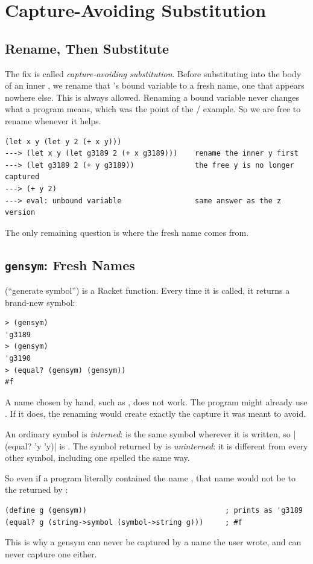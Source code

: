 \section{Capture-Avoiding Substitution}
\label{sec:capavoid}

\subsection{Rename, Then Substitute}

The fix is called \emph{capture-avoiding substitution}. Before substituting into the body of an inner , we rename that 's bound variable to a fresh name, one that appears nowhere else. This is always allowed. Renaming a bound variable never changes what a program means, which was the point of the / example. So we are free to rename whenever it helps.
\begin{lstlisting}[style=repl]
(let x y (let y 2 (+ x y)))
---> (let x y (let g3189 2 (+ x g3189)))    rename the inner y first
---> (let g3189 2 (+ y g3189))              the free y is no longer captured
---> (+ y 2)
---> eval: unbound variable                 same answer as the z version
\end{lstlisting}
The only remaining question is where the fresh name comes from.

\subsection{\texttt{gensym}: Fresh Names}

 (``generate symbol'') is a Racket function. Every time it is called, it returns a brand-new symbol:
\begin{lstlisting}[style=repl]
> (gensym)
'g3189
> (gensym)
'g3190
> (equal? (gensym) (gensym))
#f
\end{lstlisting}
A name chosen by hand, such as , does not work. The program might already use . If it does, the renaming would create exactly the capture it was meant to avoid.

\begin{definition}
An ordinary symbol is \emph{interned}:  is the same symbol wherever it is written, so \rkt|(equal? 'y 'y)| is . The symbol returned by  is \emph{uninterned}: it is different from every other symbol, including one spelled the same way.
\end{definition}
So even if a program literally contained the name , that name would not be  to the  returned by :
\begin{lstlisting}
(define g (gensym))                                ; prints as 'g3189
(equal? g (string->symbol (symbol->string g)))     ; #f
\end{lstlisting}
This is why a gensym can never be captured by a name the user wrote, and can never capture one either.

